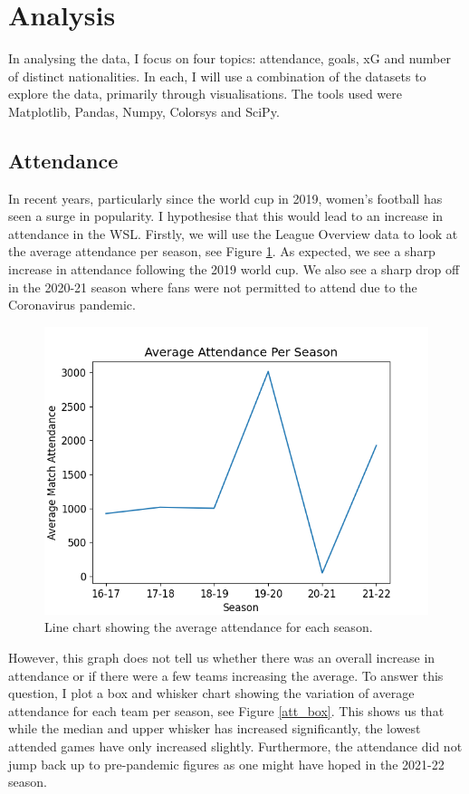 \documentclass[12pt, a4paper, twocolumn]{article}
\begin{document}
\section{Analysis}

In analysing the data, I focus on four topics: attendance, goals, xG and number of distinct nationalities. In each, I will use a combination of the datasets to explore the data, primarily through visualisations. The tools used were Matplotlib, Pandas, Numpy, Colorsys and SciPy.

\subsection{Attendance}

In recent years, particularly since the world cup in 2019, women's football has seen a surge in popularity. I hypothesise that this would lead to an increase in attendance in the WSL. Firstly, we will use the League Overview data to look at the average attendance per season, see Figure \ref{avg_att}. As expected, we see a sharp increase in attendance following the 2019 world cup. We also see a sharp drop off in the 2020-21 season where fans were not permitted to attend due to the Coronavirus pandemic. 

\begin{figure}
  \includegraphics[width=\linewidth]{../vis/tables/average_attendance.png}
  \caption{Line chart showing the average attendance for each season.}
  \label{avg_att}
 \end{figure}

However, this graph does not tell us whether there was an overall increase in attendance or if there were a few teams increasing the average. To answer this question, I plot a box and whisker chart showing the variation of average attendance for each team per season, see Figure \ref{att_box}. This shows us that while the median and upper whisker has increased significantly, the lowest attended games have only increased slightly. Furthermore, the attendance did not jump back up to pre-pandemic figures as one might have hoped in the 2021-22 season.
\end{document}
